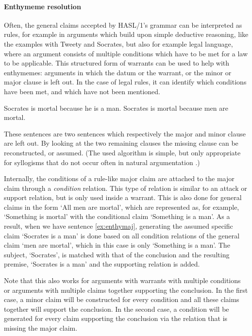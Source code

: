 \documentclass{IOS-Book-Article}
\begin{document}
\paragraph{Enthymeme resolution}
Often, the general claims accepted by HASL/1's grammar can be interpreted as rules, for example in arguments which build upon simple deductive reasoning, like the examples with Tweety and Socrates, but also for example legal language, where an argument consists of multiple conditions which have to be met for a law to be applicable. This structured form of warrants can be used to help with enthymemes: arguments in which the datum or the warrant, or the minor or major clause is left out. In the case of legal rules, it can identify which conditions have been met, and which have not been mentioned.

\begin{exe}
	\ex\label{ex:enthymin} Socrates is mortal because he is a man.
	\ex\label{ex:enthymaj} Socrates is mortal because men are mortal.
\end{exe}

\noindent These sentences are two sentences which respectively the major and minor clause are left out. By looking at the two remaining clauses the missing clause can be reconstructed, or assumed. (The used algorithm is simple, but only appropriate for syllogisms that do not occur often in natural argumentation \cite{saintDizierStede2017}.)

Internally, the conditions of a rule-like major claim are attached to the major claim through a \emph{condition} relation. This type of relation is similar to an attack or support relation, but is only used inside a warrant. This is also done for general claims in the form `All men are mortal', which are represented as, for example, `Something is mortal' with the conditional claim `Something is a man'. As a result, when we have sentence \ref{ex:enthymaj}, generating the assumed specific claim `Socrates is a man' is done based on all condition relations of the general claim `men are mortal', which in this case is only `Something is a man'. The subject, `Socrates', is matched with that of the conclusion and the resulting premise, `Socrates is a man' and the supporting relation is added.

Note that this also works for arguments with warrants with multiple conditions or arguments with multiple claims together supporting the conclusion. In the first case, a minor claim will be constructed for every condition and all these claims together will support the conclusion. In the second case, a condition will be generated for every claim supporting the conclusion via the relation that is missing the major claim.
\end{document}
